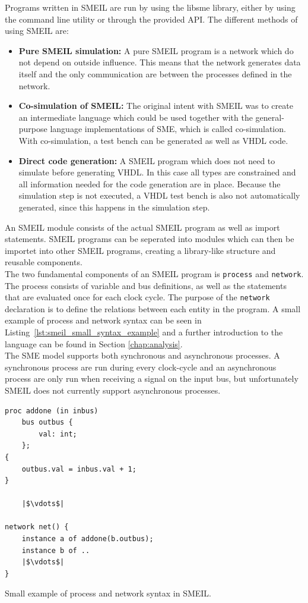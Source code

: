 Programs written in SMEIL are run by using the libsme library, either by using the command line utility or through the provided API.
The different methods of using SMEIL are:\\
\begin{itemize}
    \item \textbf{Pure SMEIL simulation:} A pure SMEIL program is a network which do not depend on outside influence. This means that the network  generates data itself and the only communication are between the processes defined in the network.
    \item \textbf{Co-simulation of SMEIL:} The original intent with SMEIL was to create an intermediate language which could be used together with the general-purpose language implementations of SME, which is called co-simulation. With co-simulation, a test bench can be generated as well as VHDL code.
    \item \textbf{Direct code generation:} A SMEIL program which does not need to simulate before generating VHDL. In this case all types are constrained and all information needed for the code generation are in place. Because the simulation step is not executed, a VHDL test bench is also not automatically generated, since this happens in the simulation step.
\end{itemize}
An SMEIL module consists of the actual SMEIL program as well as import statements. SMEIL programs can be seperated into modules which can then be importet into other SMEIL programs, creating a library-like structure and reusable components.\\

The two fundamental components of an SMEIL program is \texttt{process} and \texttt{network}. The process consists of variable and bus definitions, as well as the statements that are evaluated once for each clock cycle. The purpose of the \texttt{network} declaration is to define the relations between each entity in the program. A small example of process and network syntax can be seen in Listing~\ref{lst:smeil_small_syntax_example} and a further introduction to the language can be found in Section \ref{chap:analysis}.\\

The SME model supports both synchronous and asynchronous processes. A synchronous process are run during every clock-cycle and an asynchronous process are only run when receiving a signal on the input bus, but unfortunately SMEIL does not currently support asynchronous processes. %
\begin{listing}
\begin{verbatim}
proc addone (in inbus)
    bus outbus {
        val: int;
    };
{
    outbus.val = inbus.val + 1;
}

    |$\vdots$|

network net() {
    instance a of addone(b.outbus);
    instance b of ..
    |$\vdots$|
}
\end{verbatim}
\caption{Small example of process and network syntax in SMEIL.}
\label{lst:smeil_small_syntax_example}
\end{listing}
